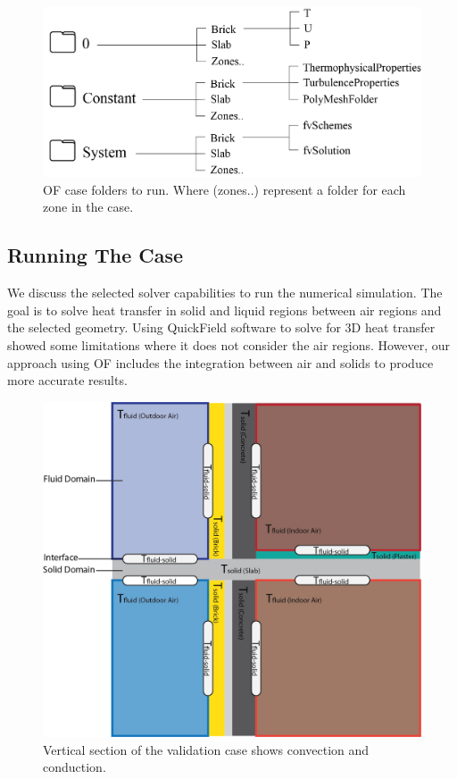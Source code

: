 \begin{figure}[tb]
\centering
\includegraphics[width=0.77\columnwidth]{Figures/constc.png}
\hspace{0.7cm}
\caption[OF Case Contents]{OF case folders to run. Where (zones..) represent a folder for each zone in the case.}
\label{constc}
\end{figure}





\subsection{Running The Case}    
 
We discuss the selected solver capabilities to run the numerical simulation. The goal is to solve heat transfer in solid and liquid regions between air regions and the selected geometry. Using QuickField software to solve for 3D heat transfer showed some limitations where it does not consider the air regions. However, our approach using \gls{OF} includes the integration between air and solids to produce more accurate results. 

\begin{figure}[tbh] 
\includegraphics[width=0.77\columnwidth]{Figures/conductive.png}
\hspace{0.7cm}
\caption[3D Interfaces]{Vertical section of the validation case shows convection and conduction.}
\label{interface}
\end{figure}

